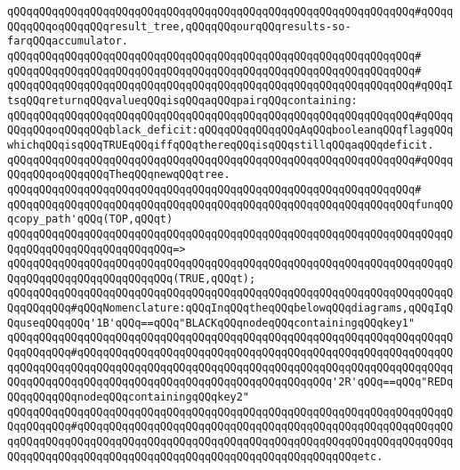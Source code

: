 \verb|qQQqqQQqqQQqqQQqqQQqqQQqqQQqqQQqqQQqqQQqqQQqqQQqqQQqqQQqqQQqqQQq#qQQqqQQqqQQqoqQQqqQQqresult_tree,qQQqqQQqourqQQqresults-so-farqQQqaccumulator.|\newline
\verb|qQQqqQQqqQQqqQQqqQQqqQQqqQQqqQQqqQQqqQQqqQQqqQQqqQQqqQQqqQQqqQQq#|\newline
\verb|qQQqqQQqqQQqqQQqqQQqqQQqqQQqqQQqqQQqqQQqqQQqqQQqqQQqqQQqqQQqqQQq#|\newline
\verb|qQQqqQQqqQQqqQQqqQQqqQQqqQQqqQQqqQQqqQQqqQQqqQQqqQQqqQQqqQQqqQQq#qQQqItsqQQqreturnqQQqvalueqQQqisqQQqaqQQqpairqQQqcontaining:|\newline
\verb|qQQqqQQqqQQqqQQqqQQqqQQqqQQqqQQqqQQqqQQqqQQqqQQqqQQqqQQqqQQqqQQq#qQQqqQQqqQQqoqQQqqQQqblack_deficit:qQQqqQQqqQQqqQQqAqQQqbooleanqQQqflagqQQqwhichqQQqisqQQqTRUEqQQqiffqQQqthereqQQqisqQQqstillqQQqaqQQqdeficit.|\newline
\verb|qQQqqQQqqQQqqQQqqQQqqQQqqQQqqQQqqQQqqQQqqQQqqQQqqQQqqQQqqQQqqQQq#qQQqqQQqqQQqoqQQqqQQqTheqQQqnewqQQqtree.|\newline
\verb|qQQqqQQqqQQqqQQqqQQqqQQqqQQqqQQqqQQqqQQqqQQqqQQqqQQqqQQqqQQqqQQq#|\newline
\verb|qQQqqQQqqQQqqQQqqQQqqQQqqQQqqQQqqQQqqQQqqQQqqQQqqQQqqQQqqQQqqQQqfunqQQqcopy_path'qQQq(TOP,qQQqt)|\newline
\verb|qQQqqQQqqQQqqQQqqQQqqQQqqQQqqQQqqQQqqQQqqQQqqQQqqQQqqQQqqQQqqQQqqQQqqQQqqQQqqQQqqQQqqQQqqQQqqQQq=>|\newline
\verb|qQQqqQQqqQQqqQQqqQQqqQQqqQQqqQQqqQQqqQQqqQQqqQQqqQQqqQQqqQQqqQQqqQQqqQQqqQQqqQQqqQQqqQQqqQQqqQQq(TRUE,qQQqt);|\newline
\newline
\verb|qQQqqQQqqQQqqQQqqQQqqQQqqQQqqQQqqQQqqQQqqQQqqQQqqQQqqQQqqQQqqQQqqQQqqQQqqQQqqQQq#qQQqNomenclature:qQQqInqQQqtheqQQqbelowqQQqdiagrams,qQQqIqQQquseqQQqqQQq'1B'qQQq==qQQq"BLACKqQQqnodeqQQqcontainingqQQqkey1"|\newline
\verb|qQQqqQQqqQQqqQQqqQQqqQQqqQQqqQQqqQQqqQQqqQQqqQQqqQQqqQQqqQQqqQQqqQQqqQQqqQQqqQQq#qQQqqQQqqQQqqQQqqQQqqQQqqQQqqQQqqQQqqQQqqQQqqQQqqQQqqQQqqQQqqQQqqQQqqQQqqQQqqQQqqQQqqQQqqQQqqQQqqQQqqQQqqQQqqQQqqQQqqQQqqQQqqQQqqQQqqQQqqQQqqQQqqQQqqQQqqQQqqQQqqQQqqQQqqQQqqQQqqQQq'2R'qQQq==qQQq"REDqQQqqQQqqQQqnodeqQQqcontainingqQQqkey2"|\newline
\verb|qQQqqQQqqQQqqQQqqQQqqQQqqQQqqQQqqQQqqQQqqQQqqQQqqQQqqQQqqQQqqQQqqQQqqQQqqQQqqQQq#qQQqqQQqqQQqqQQqqQQqqQQqqQQqqQQqqQQqqQQqqQQqqQQqqQQqqQQqqQQqqQQqqQQqqQQqqQQqqQQqqQQqqQQqqQQqqQQqqQQqqQQqqQQqqQQqqQQqqQQqqQQqqQQqqQQqqQQqqQQqqQQqqQQqqQQqqQQqqQQqqQQqqQQqqQQqqQQqqQQqqQQqetc.|\newline
